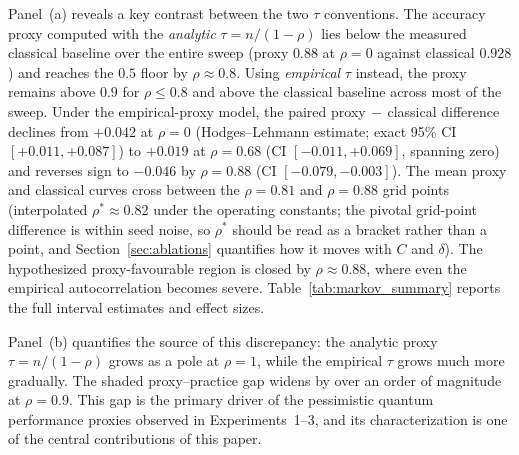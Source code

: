 \documentclass[sensors,article,submit,pdftex,moreauthors]{Definitions/mdpi}
\providecommand{\DIFadd}[1]{{\protect\color{blue}#1}} %
\providecommand{\DIFdel}[1]{} %
\providecommand{\DIFaddbegin}{} %
\providecommand{\DIFaddend}{} %
\providecommand{\DIFdelbegin}{} %
\providecommand{\DIFdelend}{} %
\begin{document}
Panel~(a) reveals a key \DIFdelbegin \DIFdel{insight: using the analytic proxy }\DIFdelend \DIFaddbegin \DIFadd{contrast between the two }\DIFaddend $\tau$ \DIFdelbegin \DIFdel{, the quantum performance proxy crosses below classical performance at $\rho \approx 0.3$, suggesting the proxy-model crossover occurs under moderate Markov correlation. However, using empirical }\DIFdelend \DIFaddbegin \DIFadd{conventions. The accuracy proxy computed with the }\emph{\DIFadd{analytic}} \DIFadd{$\tau = n/(1-\rho)$ lies below the measured classical baseline over the entire sweep (proxy $0.88$ at $\rho = 0$ against classical $0.928$) and reaches the $0.5$ floor by $\rho \approx 0.8$. Using }\emph{\DIFadd{empirical}} \DIFaddend $\tau$ instead, the \DIFdelbegin \DIFdel{empirical-$\tau$ }\DIFdelend proxy remains above $0.9$ for $\rho \leq 0.8$ and above the classical baseline across most of the sweep. Under the empirical-proxy model, the \DIFdelbegin \DIFdel{classical baseline first becomes statistically indistinguishable from the proxy near $\rho \approx 0.68$ and significantly exceeds it by $\rho \approx 0.88$ (see Table~\ref{tab:markov_summary} for paired Wilcoxon $p$-values); the proxy-model crossover therefore occurs near }\DIFdelend \DIFaddbegin \DIFadd{paired proxy$\,-\,$classical difference declines from $+0.042$ at $\rho = 0$ (Hodges--Lehmann estimate; exact 95\% CI $[+0.011, +0.087]$) to $+0.019$ at $\rho = 0.68$ (CI $[-0.011, +0.069]$, spanning zero) and reverses sign to $-0.046$ by $\rho = 0.88$ (CI $[-0.079, -0.003]$). The mean proxy and classical curves cross between the $\rho = 0.81$ and $\rho = 0.88$ grid points (interpolated $\rho^{*} \approx 0.82$ under the operating constants; the pivotal grid-point difference is within seed noise, so $\rho^{*}$ should be read as a bracket rather than a point, and Section~\ref{sec:ablations} quantifies how it moves with $C$ and $\delta$). The hypothesized proxy-favourable region is closed by }\DIFaddend $\rho \approx 0.88$, where even the empirical autocorrelation becomes severe. \DIFaddbegin \DIFadd{Table~\ref{tab:markov_summary} reports the full interval estimates and effect sizes.
}\DIFaddend 

Panel~(b) quantifies the source of this discrepancy: the analytic proxy $\tau = n/(1{-}\rho)$ grows as a pole at $\rho = 1$, while the empirical $\tau$ grows much more gradually. The shaded proxy--practice gap widens by over an order of magnitude at $\rho = 0.9$. This gap is the primary driver of the pessimistic quantum performance proxies observed in Experiments~1--3, and its characterization is one of the central contributions of this paper.
\end{document}
